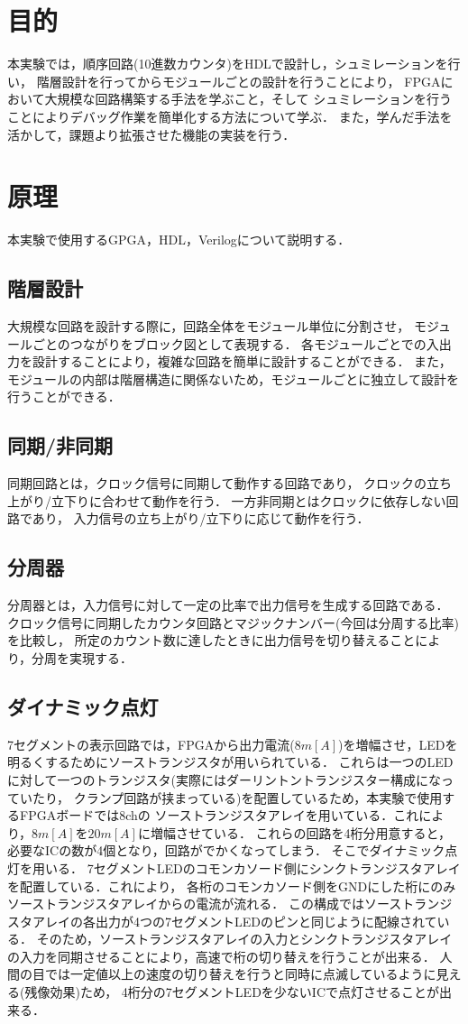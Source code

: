 \documentclass[a4paper,11pt]{ltjsarticle}
\begin{document}
\section{目的}
本実験では，順序回路(10進数カウンタ)をHDLで設計し，シュミレーションを行い，
階層設計を行ってからモジュールごとの設計を行うことにより，
FPGAにおいて大規模な回路構築する手法を学ぶこと，そして
シュミレーションを行うことによりデバッグ作業を簡単化する方法について学ぶ．
また，学んだ手法を活かして，課題より拡張させた機能の実装を行う．
\section{原理}
本実験で使用するGPGA，HDL，Verilogについて説明する．
\subsection{階層設計}
大規模な回路を設計する際に，回路全体をモジュール単位に分割させ，
モジュールごとのつながりをブロック図として表現する．
各モジュールごとでの入出力を設計することにより，複雑な回路を簡単に設計することができる．
また，モジュールの内部は階層構造に関係ないため，モジュールごとに独立して設計を行うことができる．
\subsection{同期/非同期}
同期回路とは，クロック信号に同期して動作する回路であり，
クロックの立ち上がり/立下りに合わせて動作を行う．
一方非同期とはクロックに依存しない回路であり，
入力信号の立ち上がり/立下りに応じて動作を行う．
\subsection{分周器}
分周器とは，入力信号に対して一定の比率で出力信号を生成する回路である．
クロック信号に同期したカウンタ回路とマジックナンバー(今回は分周する比率)を比較し，
所定のカウント数に達したときに出力信号を切り替えることにより，分周を実現する．
\subsection{ダイナミック点灯}
7セグメントの表示回路では，FPGAから出力電流($8m[A]$)を増幅させ，LEDを明るくするためにソーストランジスタが用いられている．
これらは一つのLEDに対して一つのトランジスタ(実際にはダーリントントランジスター構成になっていたり，
クランプ回路が挟まっている)を配置しているため，本実験で使用するFPGAボードでは8chの
ソーストランジスタアレイを用いている．これにより，$8m[A]$を$20m[A]$に増幅させている．
これらの回路を4桁分用意すると，必要なICの数が4個となり，回路がでかくなってしまう．
そこでダイナミック点灯を用いる．
7セグメントLEDのコモンカソード側にシンクトランジスタアレイを配置している．これにより，
各桁のコモンカソード側をGNDにした桁にのみソーストランジスタアレイからの電流が流れる．
この構成ではソーストランジスタアレイの各出力が4つの7セグメントLEDのピンと同じように配線されている．
そのため，ソーストランジスタアレイの入力とシンクトランジスタアレイの入力を同期させることにより，高速で桁の切り替えを行うことが出来る．
人間の目では一定値以上の速度の切り替えを行うと同時に点滅しているように見える(残像効果)ため，
4桁分の7セグメントLEDを少ないICで点灯させることが出来る．
\end{document}
